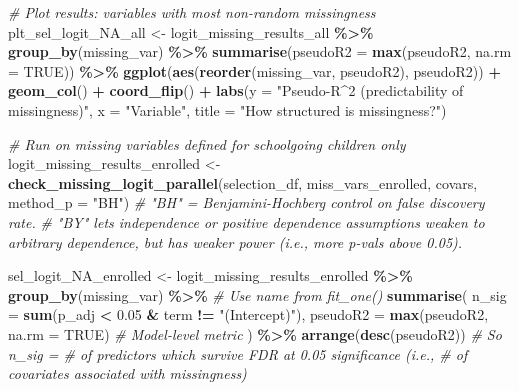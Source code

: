 \documentclass[
]{article}
\newenvironment{Shaded}{\begin{snugshade}}{\end{snugshade}}
\newcommand{\AttributeTok}[1]{\textcolor[rgb]{0.13,0.29,0.53}{#1}}
\newcommand{\CommentTok}[1]{\textcolor[rgb]{0.56,0.35,0.01}{\textit{#1}}}
\newcommand{\ConstantTok}[1]{\textcolor[rgb]{0.56,0.35,0.01}{#1}}
\newcommand{\FloatTok}[1]{\textcolor[rgb]{0.00,0.00,0.81}{#1}}
\newcommand{\FunctionTok}[1]{\textcolor[rgb]{0.13,0.29,0.53}{\textbf{#1}}}
\newcommand{\NormalTok}[1]{#1}
\newcommand{\OtherTok}[1]{\textcolor[rgb]{0.56,0.35,0.01}{#1}}
\newcommand{\SpecialCharTok}[1]{\textcolor[rgb]{0.81,0.36,0.00}{\textbf{#1}}}
\newcommand{\StringTok}[1]{\textcolor[rgb]{0.31,0.60,0.02}{#1}}
\begin{document}
\begin{Shaded}
\begin{Highlighting}[]
\CommentTok{\# Plot results: variables with most non{-}random missingness}
\NormalTok{plt\_sel\_logit\_NA\_all }\OtherTok{\textless{}{-}}\NormalTok{ logit\_missing\_results\_all }\SpecialCharTok{\%\textgreater{}\%}
  \FunctionTok{group\_by}\NormalTok{(missing\_var) }\SpecialCharTok{\%\textgreater{}\%}
  \FunctionTok{summarise}\NormalTok{(}\AttributeTok{pseudoR2 =} \FunctionTok{max}\NormalTok{(pseudoR2, }\AttributeTok{na.rm =} \ConstantTok{TRUE}\NormalTok{)) }\SpecialCharTok{\%\textgreater{}\%}
  \FunctionTok{ggplot}\NormalTok{(}\FunctionTok{aes}\NormalTok{(}\FunctionTok{reorder}\NormalTok{(missing\_var, pseudoR2), pseudoR2)) }\SpecialCharTok{+}
  \FunctionTok{geom\_col}\NormalTok{() }\SpecialCharTok{+}
  \FunctionTok{coord\_flip}\NormalTok{() }\SpecialCharTok{+}
  \FunctionTok{labs}\NormalTok{(}\AttributeTok{y =} \StringTok{"Pseudo{-}R\^{}2 (predictability of missingness)"}\NormalTok{,}
       \AttributeTok{x =} \StringTok{"Variable"}\NormalTok{,}
       \AttributeTok{title =} \StringTok{"How structured is missingness?"}\NormalTok{)}

\CommentTok{\# Run on missing variables defined for schoolgoing children only}
\NormalTok{logit\_missing\_results\_enrolled }\OtherTok{\textless{}{-}} \FunctionTok{check\_missing\_logit\_parallel}\NormalTok{(selection\_df, miss\_vars\_enrolled, covars, }\AttributeTok{method\_p =} \StringTok{"BH"}\NormalTok{) }\CommentTok{\# "BH" = Benjamini{-}Hochberg control on false discovery rate. }
\CommentTok{\# "BY" lets independence or positive dependence assumptions weaken to arbitrary dependence, but has weaker power (i.e., more p{-}vals above 0.05).}

\NormalTok{sel\_logit\_NA\_enrolled }\OtherTok{\textless{}{-}}\NormalTok{ logit\_missing\_results\_enrolled }\SpecialCharTok{\%\textgreater{}\%}
  \FunctionTok{group\_by}\NormalTok{(missing\_var) }\SpecialCharTok{\%\textgreater{}\%} \CommentTok{\# Use name from fit\_one()}
  \FunctionTok{summarise}\NormalTok{(}
    \AttributeTok{n\_sig =} \FunctionTok{sum}\NormalTok{(p\_adj }\SpecialCharTok{\textless{}} \FloatTok{0.05} \SpecialCharTok{\&}\NormalTok{ term }\SpecialCharTok{!=} \StringTok{"(Intercept)"}\NormalTok{),}
    \AttributeTok{pseudoR2 =} \FunctionTok{max}\NormalTok{(pseudoR2, }\AttributeTok{na.rm =} \ConstantTok{TRUE}\NormalTok{) }\CommentTok{\# Model{-}level metric}
\NormalTok{  ) }\SpecialCharTok{\%\textgreater{}\%}
  \FunctionTok{arrange}\NormalTok{(}\FunctionTok{desc}\NormalTok{(pseudoR2))}
\CommentTok{\# So n\_sig = \# of predictors which survive FDR at 0.05 significance (i.e., \# of covariates associated with missingness)}


\end{Highlighting}
\end{Shaded}
\end{document}

